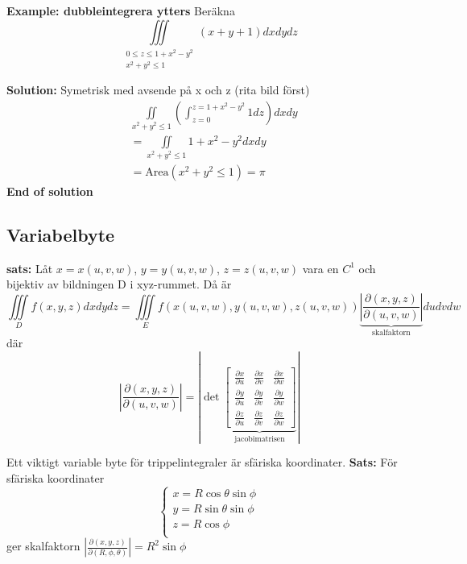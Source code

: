 \textbf{Example: dubbleintegrera ytters}
Beräkna 
\begin{equation*}
    \iiint\limits_{\substack{0\leq z\leq 1+x^2-y^2 \\ x^2+y^2\leq 1}}(x+y+1)dxdydz
\end{equation*}

\textbf{Solution:}
Symetrisk med avsende på x och z (rita bild först)
\begin{align*}
    &\iint\limits_{x^2+y^2\leq1}\left(\int^{z=1+x^2-y^2}_{z=0}1dz\right) dxdy \\
    &=\iint\limits_{x^2+y^2\leq1}1+x^2-y^2 dxdy \\
    &=\text{Area}(x^2+y^2\leq1) = \pi
\end{align*}
\textbf{End of solution}



\subsection{Variabelbyte}
\textbf{sats:} Låt $x=x(u,v,w)$, $y=y(u,v,w)$, $z=z(u,v,w)$ vara en $C^1$ och bijektiv
av bildningen D i xyz-rummet. Då är 
\begin{equation*}
    \iiint\limits_{D} f(x,y,z)dxdydz = 
    \iiint\limits_{E} f(x(u,v,w),y(u,v,w),z(u,v,w)) \underbrace{\left| \frac{\partial(x,y,z)}{\partial(u,v,w)} \right|}_{\text{skalfaktorn}} dudvdw
\end{equation*}
där 
\begin{equation*}
    \left| \frac{\partial(x,y,z)}{\partial(u,v,w)} \right| 
    = \left|\det
    \underbrace{
    \begin{bmatrix} 
        \frac{\partial x}{\partial u} & \frac{\partial x}{\partial v} & \frac{\partial x}{\partial w} \\
        \frac{\partial y}{\partial u} & \frac{\partial y}{\partial v} & \frac{\partial y}{\partial w} \\
        \frac{\partial z}{\partial u} & \frac{\partial z}{\partial v} & \frac{\partial z}{\partial w}
    \end{bmatrix}}_{\text{jacobimatrisen}}\right|
\end{equation*}

Ett viktigt variable byte för trippelintegraler är sfäriska koordinater.
\textbf{Sats:} För sfäriska koordinater
\begin{equation*}
    \begin{cases}
        x=R\cos\theta\sin\phi \\ 
        y=R\sin\theta\sin\phi \\ 
        z=R\cos\phi \\ 
    \end{cases}
\end{equation*}
ger skalfaktorn $|\frac{\partial(x,y,z)}{\partial(R,\phi,\theta)}| = R^2\sin\phi$


